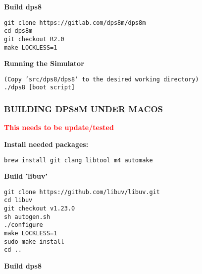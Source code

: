 \textbf{Build dps8}

\begin{adjustwidth}{5ex}{1ex}
    \texttt{git clone https://gitlab.com/dps8m/dps8m} \\
    \texttt{cd dps8m} \\
    \texttt{git checkout R2.0} \\
    \texttt{make LOCKLESS=1} \\
\end{adjustwidth}

\textbf{Running the Simulator}

\begin{adjustwidth}{5ex}{1ex}
    \texttt{(Copy 'src/dps8/dps8' to the desired working directory)} \\
    \texttt{./dps8 [boot script]} \\
\end{adjustwidth}

\newpage

\subsubsection[Building dps8m under MacOS]{BUILDING DPS8M UNDER MACOS}

\textbf{\textcolor{red}{This needs to be update/tested}}

\textbf{Install needed packages:}

\begin{adjustwidth}{5ex}{1ex}
	\texttt{brew install git clang libtool m4 automake} \\
\end{adjustwidth}

\textbf{Build 'libuv'}

\begin{adjustwidth}{5ex}{1ex}
    \texttt{git clone https://github.com/libuv/libuv.git} \\
    \texttt{cd libuv} \\
    \texttt{git checkout v1.23.0} \\
    \texttt{sh autogen.sh} \\
    \texttt{./configure} \\
    \texttt{make LOCKLESS=1} \\
    \texttt{sudo make install} \\
    \texttt{cd ..} \\
\end{adjustwidth}

\textbf{Build dps8}

